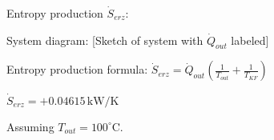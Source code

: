 Entropy production \( \dot{S}_{erz} \):  

System diagram:  
[Sketch of system with \( \dot{Q}_{out} \) labeled]  

Entropy production formula:  
\( \dot{S}_{erz} = \dot{Q}_{out} \left( \frac{1}{T_{out}} + \frac{1}{T_{KF}} \right) \)  

\( \dot{S}_{erz} = +0.04615 \, \text{kW/K} \)  

Assuming \( T_{out} = 100^\circ \text{C} \).